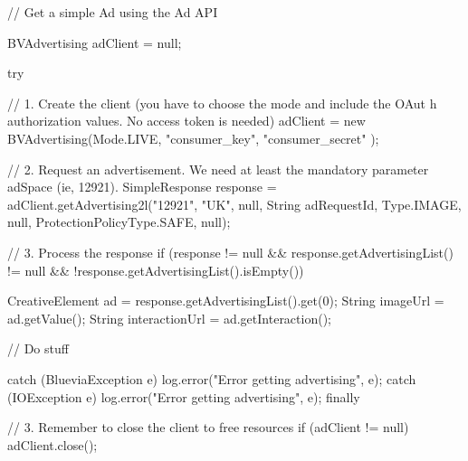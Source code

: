 \begin{DoxyCode}
// Get a simple Ad using the Ad API

BVAdvertising adClient = null;

try {

        // 1. Create the client (you have to choose the mode and include the OAut
      h authorization values. No access token is needed)
        adClient = new BVAdvertising(Mode.LIVE, "consumer_key", "consumer_secret"
      );

        // 2. Request an advertisement. We need at least the mandatory parameter 
      adSpace (ie, 12921).
        SimpleResponse response = adClient.getAdvertising2l("12921", "UK", null, 
      String adRequestId, 
                Type.IMAGE, null, ProtectionPolicyType.SAFE, null);

        // 3. Process the response
        if (response != null && response.getAdvertisingList() != null &&
                !response.getAdvertisingList().isEmpty()){

                CreativeElement ad = response.getAdvertisingList().get(0);
                String imageUrl = ad.getValue();
                String interactionUrl = ad.getInteraction();
                
                // Do stuff
        }

} catch (BlueviaException e) {
        log.error("Error getting advertising", e);
} catch (IOException e) {
        log.error("Error getting advertising", e);
} finally {

        // 3. Remember to close the client to free resources
        if (adClient != null)
                adClient.close();
} 
\end{DoxyCode}
 